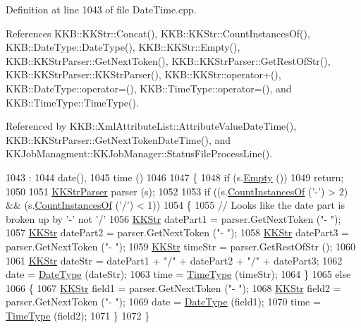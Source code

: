 Definition at line 1043 of file Date\+Time.\+cpp.



References K\+K\+B\+::\+K\+K\+Str\+::\+Concat(), K\+K\+B\+::\+K\+K\+Str\+::\+Count\+Instances\+Of(), K\+K\+B\+::\+Date\+Type\+::\+Date\+Type(), K\+K\+B\+::\+K\+K\+Str\+::\+Empty(), K\+K\+B\+::\+K\+K\+Str\+Parser\+::\+Get\+Next\+Token(), K\+K\+B\+::\+K\+K\+Str\+Parser\+::\+Get\+Rest\+Of\+Str(), K\+K\+B\+::\+K\+K\+Str\+Parser\+::\+K\+K\+Str\+Parser(), K\+K\+B\+::\+K\+K\+Str\+::operator+(), K\+K\+B\+::\+Date\+Type\+::operator=(), K\+K\+B\+::\+Time\+Type\+::operator=(), and K\+K\+B\+::\+Time\+Type\+::\+Time\+Type().



Referenced by K\+K\+B\+::\+Xml\+Attribute\+List\+::\+Attribute\+Value\+Date\+Time(), K\+K\+B\+::\+K\+K\+Str\+Parser\+::\+Get\+Next\+Token\+Date\+Time(), and K\+K\+Job\+Managment\+::\+K\+K\+Job\+Manager\+::\+Status\+File\+Process\+Line().


\begin{DoxyCode}
1043                                   :
1044       date(),
1045       time ()
1046 
1047 \{
1048   \textcolor{keywordflow}{if}  (s.\hyperlink{class_k_k_b_1_1_k_k_str_ac69942f73fffd672ec2a6e1c410afdb6}{Empty} ())
1049     \textcolor{keywordflow}{return};
1050 
1051   \hyperlink{class_k_k_b_1_1_k_k_str_parser}{KKStrParser} parser (s);
1052 
1053   \textcolor{keywordflow}{if}  ((s.\hyperlink{class_k_k_b_1_1_k_k_str_a08b9dcd254e64e4337008ab3007fdbc8}{CountInstancesOf} (\textcolor{charliteral}{'-'}) > 2)  &&  (s.\hyperlink{class_k_k_b_1_1_k_k_str_a08b9dcd254e64e4337008ab3007fdbc8}{CountInstancesOf} (\textcolor{charliteral}{'/'}) < 1))
1054   \{
1055     \textcolor{comment}{// Looks like the date part is broken up by '-' not '/'}
1056     \hyperlink{class_k_k_b_1_1_k_k_str}{KKStr}  datePart1 = parser.GetNextToken (\textcolor{stringliteral}{"- "});
1057     \hyperlink{class_k_k_b_1_1_k_k_str}{KKStr}  datePart2 = parser.GetNextToken (\textcolor{stringliteral}{"- "});
1058     \hyperlink{class_k_k_b_1_1_k_k_str}{KKStr}  datePart3 = parser.GetNextToken (\textcolor{stringliteral}{"- "});
1059     \hyperlink{class_k_k_b_1_1_k_k_str}{KKStr}  timeStr  = parser.GetRestOfStr ();
1060 
1061     \hyperlink{class_k_k_b_1_1_k_k_str}{KKStr}  dateStr = datePart1 + \textcolor{stringliteral}{"/"} + datePart2 + \textcolor{stringliteral}{"/"} + datePart3;
1062     date = \hyperlink{class_k_k_b_1_1_date_type}{DateType} (dateStr);
1063     time = \hyperlink{class_k_k_b_1_1_time_type}{TimeType} (timeStr);
1064   \}
1065   \textcolor{keywordflow}{else}
1066   \{
1067     \hyperlink{class_k_k_b_1_1_k_k_str}{KKStr}  field1 = parser.GetNextToken (\textcolor{stringliteral}{"- "});
1068     \hyperlink{class_k_k_b_1_1_k_k_str}{KKStr}  field2 = parser.GetNextToken (\textcolor{stringliteral}{"- "});
1069     date = \hyperlink{class_k_k_b_1_1_date_type}{DateType} (field1);
1070     time = \hyperlink{class_k_k_b_1_1_time_type}{TimeType} (field2);
1071   \}
1072 \}
\end{DoxyCode}


